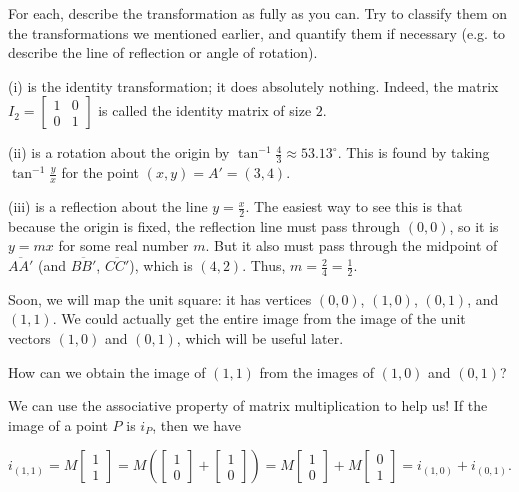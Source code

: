 \documentclass[../gatm_answers.tex]{subfiles}
\begin{document}
\begin{inner_problem}
\item For each, describe the transformation as fully as you can. Try to classify them on the transformations we mentioned earlier, and quantify them if necessary (e.g. to describe the line of reflection or angle of rotation).
\end{inner_problem}

(i) is the identity transformation; it does absolutely nothing. Indeed, the matrix $I_2=\begin{bmatrix} 1 & 0 \\ 0 & 1 \end{bmatrix}$ is called the identity matrix of size $2$.

(ii) is a rotation about the origin by $\tan^{-1} \frac{4}{3} \approx 53.13^\circ$. This is found by taking $\tan^{-1} \frac{y}{x}$ for the point $(x,y)=A'=(3,4)$.

(iii) is a reflection about the line $y = \frac{x}{2}$. The easiest way to see this is that because the origin is fixed, the reflection line must pass through $(0,0)$, so it is $y =mx$ for some real number $m$. But it also must pass through the midpoint of $\overline{AA'}$ (and $\overline{BB'}$, $\overline{CC'}$), which is $(4,2)$. Thus, $m=\frac{2}{4}=\frac{1}{2}$.

\begin{outer_problem}
\item Soon, we will map the unit square: it has vertices $(0,0)$, $(1,0)$, $(0,1)$, and $(1,1)$. We could actually get the entire image from the image of the unit vectors $(1,0)$ and $(0,1)$, which will be useful later.
\end{outer_problem}

\begin{inner_problem}[start=1]
\item How can we obtain the image of $(1,1)$ from the images of $(1,0)$ and $(0,1)$?
\end{inner_problem}

We can use the associative property of matrix multiplication to help us! If the image of a point $P$ is $i_P$, then we have

$$i_(1,1) = M\begin{bmatrix} 1 \\ 1 \end{bmatrix} = M\left(\begin{bmatrix} 1 \\ 0 \end{bmatrix} + \begin{bmatrix} 1 \\ 0 \end{bmatrix}\right) = M\begin{bmatrix} 1 \\ 0 \end{bmatrix} + M\begin{bmatrix} 0 \\ 1 \end{bmatrix} = i_{(1,0)} + i_{(0,1)}.$$
\end{document}
